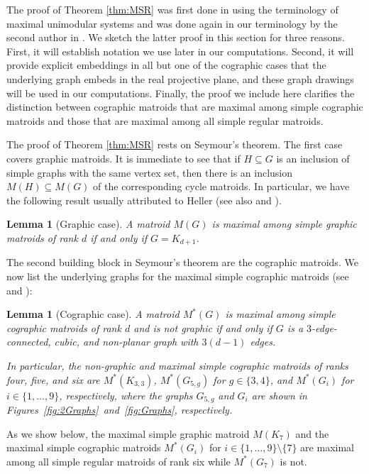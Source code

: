 \documentclass[reqno,12pt]{amsart}
\newtheorem{lemma}[theorem]{Lemma}
\numberwithin{theorem}{section}
\theoremstyle{plain}
\theoremstyle{definition}
\theoremstyle{remark}
\numberwithin{equation}{section}
\numberwithin{table}{section}
\begin{document}
The proof of Theorem \ref{thm:MSR} was first done in \cite{DanilovGrishukhin99} using the terminology of maximal unimodular systems and was done again in our terminology by the second author in \cite{Israel-PhD}. We sketch the latter proof in this section for three reasons. First, it will establish notation we use later in our computations. Second, it will provide explicit embeddings in all but one of the cographic cases that the underlying graph embeds in the real projective plane, and these graph drawings will be used in our computations. Finally, the proof we include here clarifies the distinction between cographic matroids that are maximal among simple cographic matroids and those that are maximal among all simple regular matroids. 

The proof of Theorem \ref{thm:MSR} rests on Seymour's theorem. The first case covers graphic matroids. It is immediate to see that if $H \subseteq G$ is an inclusion of simple graphs with the same vertex set, then there is an inclusion $M(H) \subseteq M(G)$ of the corresponding cycle matroids. In particular, we have the following result usually attributed to Heller \cite{Heller57}(see also \cite[2.1]{DanilovGrishukhin99} and \cite[Theorem 32]{Israel-PhD}).

\begin{lemma}[Graphic case]\label{lem:graphic}
A matroid $M(G)$ is maximal among simple graphic matroids of rank $d$ if and only if $G = K_{d+1}$.
\end{lemma}

The second building block in Seymour's theorem are the cographic matroids. We now list the underlying graphs for the maximal simple cographic matroids (see \cite[Lemmas 2 and 3]{DanilovGrishukhin99} and \cite[Theorem 34 and Lemma 35]{Israel-PhD}): 

\begin{lemma}[Cographic case]\label{lem:cographic}
A matroid $M^*(G)$ is maximal among simple cographic matroids of rank $d$ and is not graphic if and only if $G$ is a $3$-edge-connected, cubic, and non-planar graph with $3(d-1)$ edges.

In particular, the non-graphic and maximal simple cographic matroids of ranks four, five, and six are $M^*(K_{3,3})$, $M^*(G_{5,g})$ for $g \in \{3,4\}$, and $M^*(G_i)$ for $i \in \{1, \ldots, 9\}$, respectively, where the graphs $G_{5,g}$ and $G_i$ are shown in Figures~\ref{fig:2Graphs}~and~\ref{fig:Graphs}, respectively.
\end{lemma}

As we show below, the maximal simple graphic matroid $M(K_7)$ and the maximal simple cographic matroids $M^*(G_i)$ for $i \in \{1,\ldots, 9\} \setminus \{7\}$ are maximal among all simple regular matroids of rank six while $M^*(G_7)$ is not. %
\end{document}
